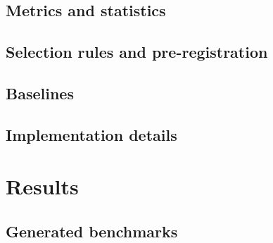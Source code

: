 \documentclass[runningheads]{llncs}
\begin{document}
\subsection{Metrics and statistics}
\label{sec:metrics}

\subsection{Selection rules and pre-registration}
\label{sec:prereg}

\subsection{Baselines}
\label{sec:baselines}

\subsection{Implementation details}
\label{sec:impl}

\section{Results}
\label{sec:results}

\subsection{Generated benchmarks}
\label{sec:res-generated}
\end{document}
